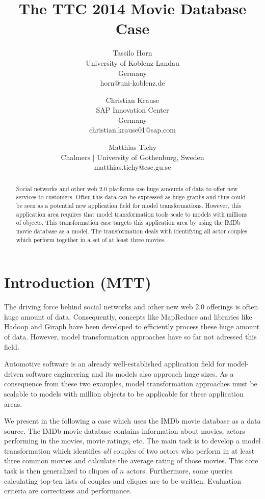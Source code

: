 \documentclass[a4paper,11pt]{article}
\title{The TTC 2014 Movie Database Case}
\author{
Tassilo Horn\\ University of Koblenz-Landau\\ Germany\\ horn@uni-koblenz.de
\and
Christian Krause\\ SAP Innovation Center\\ Germany\\ christian.krause01@sap.com
\and
Matthias Tichy\\ Chalmers $|$ University of Gothenburg, Sweden \\matthias.tichy@cse.gu.se
}
\begin{document}
\maketitle

\begin{abstract}
  Social networks and other web 2.0 platforms use huge amounts of data to offer
  new services to customers. Often this data can be expressed as huge graphs
  and thus could be seen as a potential new application field for model
  transformations. However, this application area requires that model
  transformation tools scale to models with millions of objects. This
  transformation case targets this application area by using the IMDb movie
  database as a model. The transformation deals with identifying all actor
  couples which perform together in a set of at least three movies.
  \end{abstract}
\vskip 32pt


\section{Introduction (MTT)}

The driving force behind social networks and other new web 2.0
offerings is often huge amount of data. Consequently, concepts like
MapReduce \cite{Dean08} and libraries like Hadoop \cite{Hadoop} and
Giraph \cite{Giraph} have been developed to efficiently process these
huge amount of data. However, model transformation approaches have so
far not adressed this field.

Automotive software is an already well-established application field
for model-driven software engineering and its models also approach
huge sizes. As a consequence from these two examples, model
transformation approaches must be scalable to models with million
objects to be applicable for these application areas.

We present in the following a case which uses the IMDb movie database
\cite{IMDBDATA} as a data source. The IMDb movie database contains information
about movies, actors performing in the movies, movie ratings, etc. The main
task is to develop a model transformation which identifies \emph{all} couples
of two actors who perform in at least three common movies and calculate the
average rating of those movies.  This core task is then generalized to cliques
of \(n\) actors.  Furthermore, some queries calculating top-ten lists of
couples and cliques are to be written.  Evaluation criteria are correctness and
performance.
\end{document}
